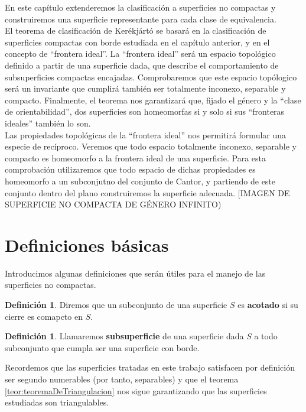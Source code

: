 \documentclass[a4paper,11pt,spanish, twoside, leqno]{tfg-uam}
\theoremstyle{definition}
\newtheorem{defin}[teor]{Definici\'on}
\begin{document}
En este capítulo extenderemos la clasificación a superficies no compactas y construiremos una superficie representante para cada clase de equivalencia.\\
El teorema de clasificación de Kerékjártó se basará en la clasificación de superficies compactas con borde estudiada en el capítulo anterior, y en el concepto de ``frontera ideal''. La ``frontera ideal'' será un espacio topológico definido a partir de una superficie dada, que describe el comportamiento de subsuperficies compactas encajadas. Comprobaremos que este espacio topólogico será un invariante que cumplirá también ser totalmente inconexo, separable y compacto. Finalmente, el teorema nos garantizará que, fijado el género y la ``clase de orientabilidad'', dos superficies son homeomorfas si y solo si sus ``fronteras ideales'' también lo son.\\
Las propiedades topológicas de la ``frontera ideal'' nos permitirá formular una especie de recíproco. Veremos que todo espacio totalmente inconexo, separable y compacto es homeomorfo a la frontera ideal de una superficie. Para esta comprobación utilizaremos que todo espacio de dichas propiedades es homeomorfo a un subconjutno del conjunto de Cantor, y partiendo de este conjunto dentro del plano construiremos la superficie adecuada. 
[IMAGEN DE SUPERFICIE NO COMPACTA DE GÉNERO INFINITO)

\section{Definiciones básicas}
Introducimos algunas definiciones que serán útiles para el manejo de las superficies no compactas.

\begin{defin}
Diremos que un subconjunto de una superficie $S$ es \textbf{acotado} si su cierre es comapcto en $S$.
\end{defin}

\begin{defin}
Llamaremos \textbf{subsuperficie} de una superficie dada $S$ a todo subconjunto que cumpla ser una superficie con borde.
\end{defin} 

Recordemos que las superficies tratadas en este trabajo satisfacen por definición ser segundo numerables (por tanto, separables) y que el teorema \ref{teor:teoremaDeTriangulacion} nos sigue garantizando que las superficies estudiadas son triangulables.\\
\end{document}
